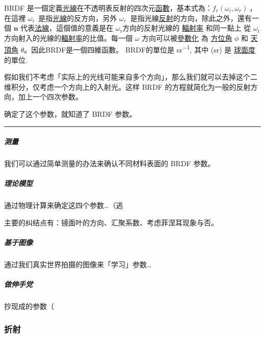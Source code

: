 \documentclass[
]{article}
\begin{document}
BRDF
是一個定義\href{https://zh.wikipedia.org/wiki/光}{光線}在不透明表反射的四次元\href{https://zh.wikipedia.org/wiki/函數}{函數}，基本式為：\({\displaystyle {f_{r}(\omega _{i},\omega _{r})\ }}\)，在這裡
\({\displaystyle \omega _{i}\ }\)
是指\href{https://zh.wikipedia.org/wiki/光線}{光線}的反方向，另外
\({\displaystyle \omega _{r}\ }\)
是指光線\href{https://zh.wikipedia.org/wiki/反射}{反射}的方向，除此之外，還有一個
\({\displaystyle \mathbf {n} }\)
代表\href{https://zh.wikipedia.org/wiki/法线}{法線}，這個值的意義是在
\({\displaystyle \omega _{\text{r}}}\)方向的反射光線的
\href{https://zh.wikipedia.org/wiki/辐射率}{輻射率} 和同一點上 從
\({\displaystyle \omega _{\text{i}}}\)
方向射入的光線的\href{https://zh.wikipedia.org/wiki/辐射率}{輻射率}的比值。每一個
\(\omega \)
方向可以被\href{https://zh.wikipedia.org/w/index.php?title=参数化\&action=edit\&redlink=1}{參數化}
為 \href{https://zh.wikipedia.org/wiki/方位角}{方位角} \(\phi\) 和
\href{https://zh.wikipedia.org/wiki/天頂角}{天頂角}
\(\theta\)。因此BRDF是一個四維函數。 BRDF的單位是
sr\textsuperscript{−1}, 其中 (sr) 是
\href{https://zh.wikipedia.org/wiki/球面度}{球面度}的單位.

假如我们不考虑「实际上的光线可能来自多个方向」，那么我们就可以去掉这个二维积分，仅考虑一个方向上的入射光。这样
BRDF 的方程就简化为一般的反射方向，加上一个四次参数。

确定了这个参数，就知道了 BRDF 参数。

\begin{center}\rule{0.5\linewidth}{\linethickness}\end{center}

\hypertarget{header-n19}{%
\subparagraph{测量}\label{header-n19}}

我们可以通过简单测量的办法来确认不同材料表面的 BRDF 参数。

\hypertarget{header-n21}{%
\subparagraph{理论模型}\label{header-n21}}

通过物理计算来确定这四个参数\ldots（逃

主要的纠结点有：镜面叶的方向、汇聚系数、考虑菲涅耳现象与否。

\hypertarget{header-n24}{%
\subparagraph{基于图像}\label{header-n24}}

通过我们真实世界拍摄的图像来「学习」参数\ldots{}

\hypertarget{header-n26}{%
\subparagraph{做伸手党}\label{header-n26}}

抄现成的参数（

\hypertarget{header-n28}{%
\subsubsection{折射}\label{header-n28}}
\end{document}
